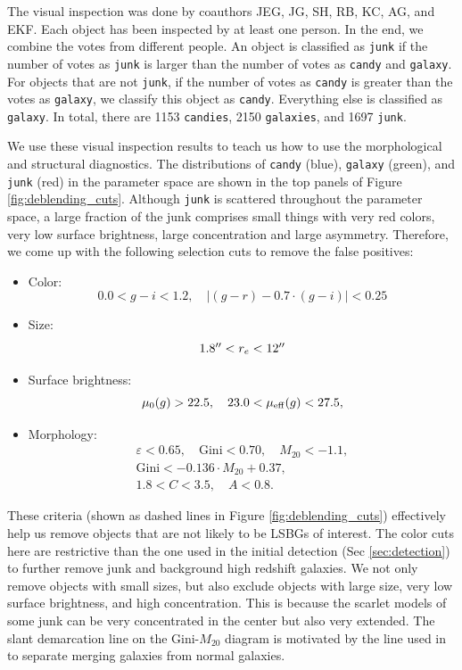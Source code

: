 \documentclass[twocolumn,astrosymb,twocolappendix]{aastex631}
\newcommand{\code}[1]{\texttt{#1}}
\begin{document}
\begin{CJK*}{UTF8}{gbsn}
The visual inspection was done by coauthors JEG, JG, SH, RB, KC, AG, and EKF. Each object has been inspected by at least one person. In the end, we combine the votes from different people. An object is classified as \code{junk} if the number of votes as \code{junk} is larger than the number of votes as \code{candy} and \code{galaxy}. For objects that are not \code{junk}, if the number of votes as \code{candy} is greater than the votes as \code{galaxy}, we classify this object as \code{candy}. Everything else is classified as \code{galaxy}. In total, there are 1153 \code{candies}, 2150 \code{galaxies}, and 1697 \code{junk}. 

We use these visual inspection results to teach us how to use the morphological and structural diagnostics. The distributions of \code{candy} (blue), \code{galaxy} (green), and \code{junk} (red) in the parameter space are shown in the top panels of Figure \ref{fig:deblending_cuts}. Although \code{junk} is scattered throughout the parameter space, a large fraction of the junk comprises small things with very red colors, very low surface brightness, large concentration and large asymmetry. Therefore, we come up with the following selection cuts to remove the false positives:
\begin{itemize}
    \item Color:
    \[0.0 < g-i < 1.2,\quad |(g-r) - 0.7\cdot (g-i)| < 0.25\]
    \item Size: \[1.8 \mbox{$^{\prime\prime}$} < r_e < 12 \mbox{$^{\prime\prime}$}\]
    \item Surface brightness: \[\mu_0(g) > 22.5,\quad 23.0 < \mu_{\rm eff}(g) < 27.5,\]
    \item Morphology: 
    \begin{gather*}
        \varepsilon < 0.65,\quad \mathrm{Gini} < 0.70,\quad M_{20} < -1.1,\\
        \mathrm{Gini} < -0.136\cdot M_{20} + 0.37,\\
        1.8 < C < 3.5,\quad A < 0.8.
    \end{gather*}
\end{itemize}
These criteria (shown as dashed lines in Figure \ref{fig:deblending_cuts}) effectively help us remove objects that are not likely to be LSBGs of interest. The color cuts here are restrictive than the one used in the initial detection (Sec \ref{sec:detection}) to further remove junk and background high redshift galaxies. We not only remove objects with small sizes, but also exclude objects with large size, very low surface brightness, and high concentration. This is because the scarlet models of some junk can be very concentrated in the center but also very extended. The slant demarcation line on the Gini-$M_{20}$ diagram is motivated by the line used in \citet{Lotz2008} to separate merging galaxies from normal galaxies. 


\end{CJK*}
\end{document}
